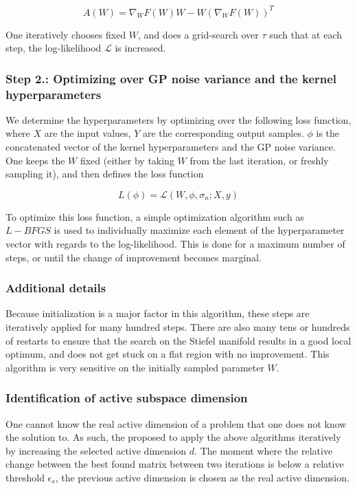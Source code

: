 \begin{equation}
A(W) = \nabla_{W} F(W) W - W ( \nabla_{W} F(W) )^T
\end{equation}

One iteratively chooses fixed $W$, and does a grid-search over $\tau$ such that at each step, the log-likelihood $\mathcal{L}$ is increased.

\subsubsection{Step 2.: Optimizing over GP noise variance and the kernel hyperparameters}

We determine the hyperparameters by optimizing over the following loss function, where $X$ are the input values, $Y$ are the corresponding output samples. $\phi$ is the concatenated vector of the kernel hyperparameters and the GP noise variance. \\

One keeps the $W$ fixed (either by taking $W$ from the last iteration, or freshly sampling it), and then defines the loss function

\begin{equation}
	L(\phi) = \mathcal{L}(W, \phi, \sigma_n; X, y) 
\end{equation}

To optimize this loss function, a simple optimization algorithm such as $L-BFGS$ is used to individually maximize each element of the hyperparameter vector with regards to the log-likelihood.
This is done for a maximum number of steps, or until the change of improvement becomes marginal. \\

\subsubsection{Additional details}
Because initialization is a major factor in this algorithm, these steps are iteratively applied for many hundred steps.
There are also many tens or hundreds of restarts to ensure that the search on the Stiefel manifold results in a good local optimum, and does not get stuck on a flat region with no improvement.
This algorithm is very sensitive on the initially sampled parameter $W$.

\subsubsection{Identification of active subspace dimension }
One cannot know the real active dimension of a problem that one does not know the solution to.
As such, the proposed to apply the above algorithms iteratively by increasing the selected active dimension $d$.
The moment where the relative change between the best found matrix between two iterations is below a relative threshold $\epsilon_s$, the previous active dimension is chosen as the real active dimension. 


